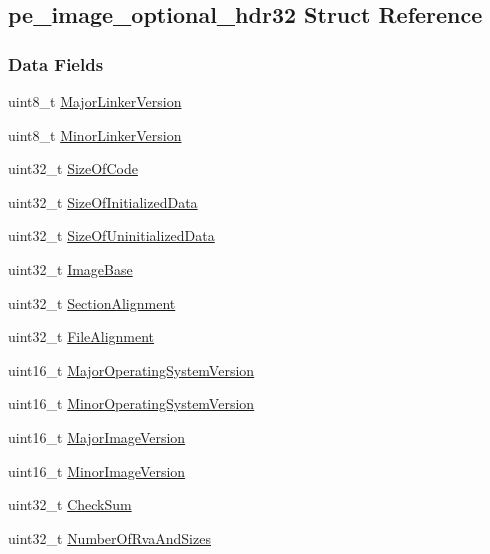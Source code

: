 \hypertarget{structpe__image__optional__hdr32}{
\subsection{pe\_\-image\_\-optional\_\-hdr32 Struct Reference}
\label{structpe__image__optional__hdr32}
}
\subsubsection*{Data Fields}
\begin{DoxyCompactItemize}
\item 
uint8\_\-t \hyperlink{structpe__image__optional__hdr32_a9fe20c528b23d8a85a250c33c761b840}{MajorLinkerVersion}
\item 
uint8\_\-t \hyperlink{structpe__image__optional__hdr32_a0cc5019694053488b343a458fbc0b657}{MinorLinkerVersion}
\item 
uint32\_\-t \hyperlink{structpe__image__optional__hdr32_abee9ed2d772fb9bec9f70e22d8f85c23}{SizeOfCode}
\item 
uint32\_\-t \hyperlink{structpe__image__optional__hdr32_a042c05a92b0c90acf2e1ee4672857153}{SizeOfInitializedData}
\item 
uint32\_\-t \hyperlink{structpe__image__optional__hdr32_aa82afa1757a8a7b76df97b35b4afea84}{SizeOfUninitializedData}
\item 
uint32\_\-t \hyperlink{structpe__image__optional__hdr32_a29eb1ba379985eaa71d0c25142f90b50}{ImageBase}
\item 
uint32\_\-t \hyperlink{structpe__image__optional__hdr32_ae19363fc9558f4fe8d710789d031f9ac}{SectionAlignment}
\item 
uint32\_\-t \hyperlink{structpe__image__optional__hdr32_a52c4f3c684bea4212e4fb8289794eb0d}{FileAlignment}
\item 
uint16\_\-t \hyperlink{structpe__image__optional__hdr32_a47b3939102eef106f0fc4d6a96c3ad14}{MajorOperatingSystemVersion}
\item 
uint16\_\-t \hyperlink{structpe__image__optional__hdr32_a8eb1d37329b3c54e63e8eb7832e30ba7}{MinorOperatingSystemVersion}
\item 
uint16\_\-t \hyperlink{structpe__image__optional__hdr32_a2902b4670e5eab8fcc2dc47c7fca868b}{MajorImageVersion}
\item 
uint16\_\-t \hyperlink{structpe__image__optional__hdr32_a7b61bcb8b63930c239079916325ae734}{MinorImageVersion}
\item 
uint32\_\-t \hyperlink{structpe__image__optional__hdr32_ab09f6da5ce2f33ac63606127b1bb2760}{CheckSum}
\item 
uint32\_\-t \hyperlink{structpe__image__optional__hdr32_a51e6fb2cbc64a53b2bb577f2dd2f677f}{NumberOfRvaAndSizes}
\end{DoxyCompactItemize}


